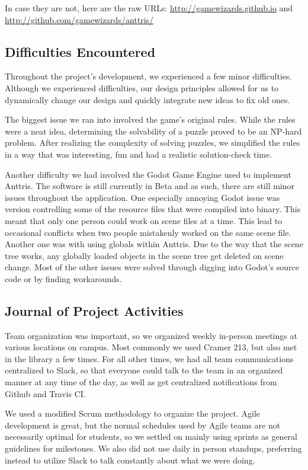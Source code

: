 \documentclass[12pt]{article}
\begin{document}
In case they are not, here are the raw URLs: \url{http://gamewizards.github.io} and \url{http://github.com/gamewizards/anttris/}

\subsection{Difficulties Encountered} %
Throughout the project's development, we experienced a few minor difficulties. Although we experienced difficulties, our design principles allowed for us to dynamically change our design and quickly integrate new ideas to fix old ones.

The biggest issue we ran into involved the game's original rules. While the rules were a neat idea, determining the solvability of a puzzle proved to be an NP-hard problem. After realizing the complexity of solving puzzles, we simplified the rules in a way that was interesting, fun and had a realistic solution-check time.

Another difficulty we had involved the Godot Game Engine used to implement Anttris. The software is still currently in Beta and as such, there are still minor issues throughout the application. One especially annoying Godot issue was version controlling some of the resource files that were compiled into binary. This meant that only one person could work on scene files at a time. This lead to occasional conflicts when two people mistakenly worked on the same scene file. Another one was with using globals within Anttris. Due to the way that the scene tree works, any globally loaded objects in the scene tree get deleted on scene change. Most of the other issues were solved through digging into Godot's source code or by finding workarounds.
\subsection{Journal of Project Activities} %
Team organization was important, so we organized weekly in-person meetings at various locations on campus. Most commonly we used Cramer 213, but also met in the library a few times. For all other times, we had all team communications centralized to Slack, so that everyone could talk to the team in an organized manner at any time of the day, as well as get centralized notifications from Github and Travis CI.

We used a modified Scrum methodology to organize the project. Agile development is great, but the normal schedules used by Agile teams are not necessarily optimal for students, so we settled on mainly using sprints as general guidelines for milestones. We also did not use daily in person standups, preferring instead to utilize Slack to talk constantly about what we were doing.
\end{document}
